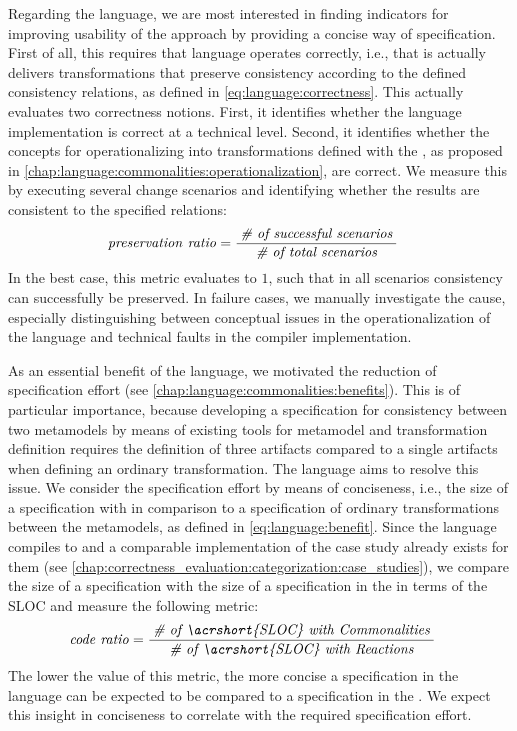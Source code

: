 Regarding the \commonalities language, we are most interested in finding indicators for improving usability of the \commonalities approach by providing a concise way of specification.
First of all, this requires that language operates correctly, i.e., that is actually delivers transformations that preserve consistency according to the defined consistency relations, as defined in \autoref{eq:language:correctness}.
This actually evaluates two correctness notions. 
First, it identifies whether the language implementation is correct at a technical level.
Second, it identifies whether the concepts for operationalizing \commonalities into transformations defined with the \reactionslanguage, as proposed in \autoref{chap:language:commonalities:operationalization}, are correct.
We measure this by executing several change scenarios and identifying whether the results are consistent to the specified relations:
\begin{align*}
    &
    \mathit{preservation\ ratio} = \frac{\; \textit{\# of successful scenarios} \;}{\; \textit{\# of total scenarios} \;}
\end{align*}
In the best case, this metric evaluates to $1$, such that in all scenarios consistency can successfully be preserved.
In failure cases, we manually investigate the cause, especially distinguishing between conceptual issues in the operationalization of the \commonalities language and technical faults in the compiler implementation.

As an essential benefit of the \commonalities language, we motivated the reduction of specification effort (see \autoref{chap:language:commonalities:benefits}).
This is of particular importance, because developing a \commonalities specification for consistency between two metamodels by means of existing tools for metamodel and transformation definition requires the definition of three artifacts compared to a single artifacts when defining an ordinary transformation.
The \commonalities language aims to resolve this issue.
We consider the specification effort by means of conciseness, i.e., the size of a specification with \commonalities in comparison to a specification of ordinary transformations between the metamodels, as defined in \autoref{eq:language:benefit}.
Since the \commonalities language compiles to \reactions and a comparable implementation of the case study already exists for them (see \autoref{chap:correctness_evaluation:categorization:case_studies}), we compare the size of a \commonalities specification with the size of a specification in the \reactionslanguage in terms of the \gls{SLOC} and measure the following metric:
\begin{align*}
    &
    \mathvariable{code\ ratio} = \frac{\mathtextspacearound{\# of \acrshort{SLOC} with \commonalities}}{\mathtextspacearound{\# of \acrshort{SLOC} with \reactions}}
\end{align*}
The lower the value of this metric, the more concise a specification in the \commonalities language can be expected to be compared to a specification in the \reactionslanguage.
We expect this insight in conciseness to correlate with the required specification effort.


